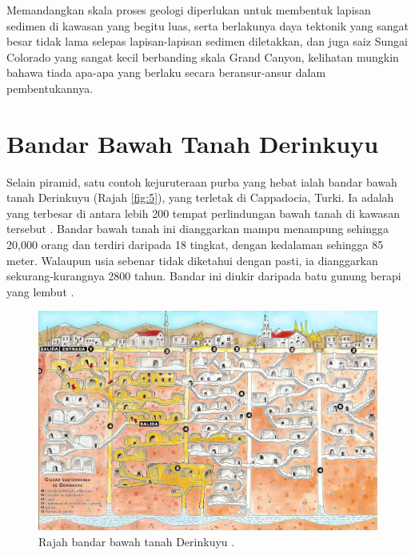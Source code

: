 \documentclass[10pt,twocolumn,letterpaper]{article}
\begin{document}
Memandangkan skala proses geologi diperlukan untuk membentuk lapisan sedimen di kawasan yang begitu luas, serta berlakunya daya tektonik yang sangat besar tidak lama selepas lapisan-lapisan sedimen diletakkan, dan juga saiz Sungai Colorado yang sangat kecil berbanding skala Grand Canyon, kelihatan mungkin bahawa tiada apa-apa yang berlaku secara beransur-ansur dalam pembentukannya.

\section{Bandar Bawah Tanah Derinkuyu}

Selain piramid, satu contoh kejuruteraan purba yang hebat ialah bandar bawah tanah Derinkuyu (Rajah \ref{fig:5}), yang terletak di Cappadocia, Turki. Ia adalah yang terbesar di antara lebih 200 tempat perlindungan bawah tanah di kawasan tersebut \cite{54}. Bandar bawah tanah ini dianggarkan mampu menampung sehingga 20,000 orang dan terdiri daripada 18 tingkat, dengan kedalaman sehingga 85 meter. Walaupun usia sebenar tidak diketahui dengan pasti, ia dianggarkan sekurang-kurangnya 2800 tahun. Bandar ini diukir daripada batu gunung berapi yang lembut \cite{52, 53}.

\begin{figure}[b]
\begin{center}

   \includegraphics[width=1\linewidth]{derinkuyu.jpeg}
\end{center}
   \caption{Rajah bandar bawah tanah Derinkuyu \cite{56}.}
\label{fig:5}
\label{fig:onecol}
\end{figure}
\end{document}
